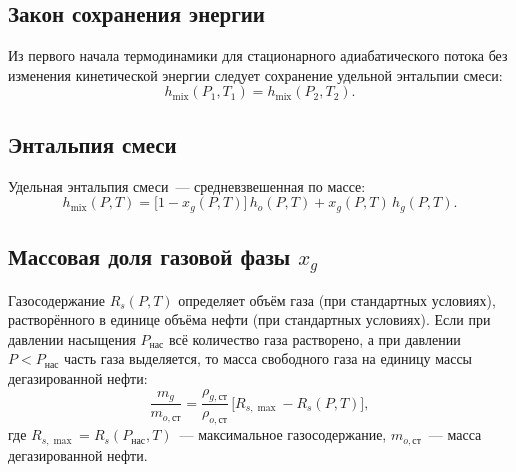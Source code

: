 \documentclass[12pt,a4paper]{article}
\begin{document}
\subsection{Закон сохранения энергии}

Из первого начала термодинамики для стационарного адиабатического потока
без изменения кинетической энергии следует сохранение удельной энтальпии
смеси:
\begin{equation}\label{eq:enthalpy}
  \boxed{\;h_{\mathrm{mix}}(P_1, T_1) = h_{\mathrm{mix}}(P_2, T_2).\;}
\end{equation}

\subsection{Энтальпия смеси}

Удельная энтальпия смеси~--- средневзвешенная по массе:
\begin{equation}\label{eq:Hmix}
  h_{\mathrm{mix}}(P,T) = \bigl[1 - x_g(P,T)\bigr]\,h_o(P,T)
                         + x_g(P,T)\,h_g(P,T).
\end{equation}

\subsection{Массовая доля газовой фазы $x_g$}

Газосодержание $R_s(P,T)$ определяет объём газа (при стандартных условиях),
растворённого в единице объёма нефти (при стандартных условиях). Если
при давлении насыщения $P_{\text{нас}}$ всё количество газа растворено,
а при давлении~$P < P_{\text{нас}}$ часть газа выделяется, то масса
свободного газа на единицу массы дегазированной нефти:
\begin{equation}\label{eq:mg_spec}
  \frac{m_g}{m_{o,\text{ст}}}
    = \frac{\rho_{g,\text{ст}}}{\rho_{o,\text{ст}}}\,
      \bigl[R_{s,\max} - R_s(P,T)\bigr],
\end{equation}
где $R_{s,\max} = R_s(P_{\text{нас}}, T)$~--- максимальное газосодержание,
$m_{o,\text{ст}}$~--- масса дегазированной нефти.
\end{document}
